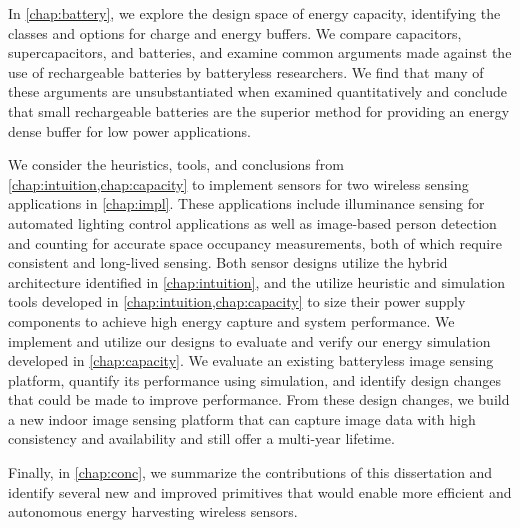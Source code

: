 In \cref{chap:battery}, we explore the design space of energy capacity, identifying the classes and options for charge and energy buffers. We compare capacitors, supercapacitors, and batteries, and examine common arguments made against the use of rechargeable batteries by batteryless researchers.
We find that many of these arguments are unsubstantiated when examined quantitatively and conclude that small rechargeable batteries are the superior method for providing an energy dense buffer for low power applications.

We consider the heuristics, tools, and conclusions from \cref{chap:intuition,chap:capacity} to implement sensors for two wireless sensing applications in \cref{chap:impl}. 
These applications include illuminance sensing for automated lighting control applications as well as image-based person detection and counting for accurate space occupancy measurements, both of which require consistent and long-lived sensing. 
Both sensor designs utilize the hybrid architecture identified in \cref{chap:intuition}, and the utilize heuristic and simulation tools developed in \cref{chap:intuition,chap:capacity} to size their power supply components to achieve high energy capture and system performance. 
We implement and utilize our designs to evaluate and verify our energy simulation developed in \cref{chap:capacity}. 
We evaluate an existing batteryless image sensing platform, quantify its performance using simulation, and identify design changes that could be made to improve performance.
From these design changes, we build a new indoor image sensing platform that can capture image data with high consistency and availability and still offer a multi-year lifetime. 

Finally, in \cref{chap:conc}, we summarize the contributions of this dissertation and identify several new and improved primitives that would enable more efficient and autonomous energy harvesting wireless sensors. 

